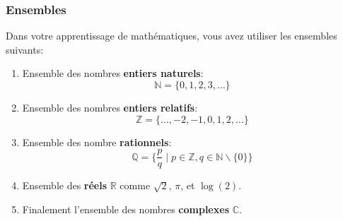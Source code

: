 \documentclass{beamer}
\begin{document}
\begin{frame}[t]
  \frametitle{Ensembles}
  {\small
     Dans votre apprentissage de mathématiques, vous avez utiliser les
      ensembles suivants:
    }

  \begin{enumerate}
    \item Ensemble des nombres \alert{\textbf{entiers naturels}}: $$\mathbb{N} =
      \{0,1,2,3,\ldots\}$$
    \item Ensemble des nombres \alert{\textbf{entiers relatifs}}: $$\mathbb{Z} =
      \{\ldots, -2, -1, 0, 1, 2, \ldots\}$$
    \item Ensemble des nombre \alert{\textbf{rationnels}}:
      $$
      \mathbb{Q} = \{\frac{p}{q}\;|\; p\in\mathbb{Z}, q\in
      \mathbb{N}\backslash\{0\}\}
      $$
    \item Ensemble des \alert{\textbf{réels}} $\mathbb{R}$ comme $\sqrt{2}$, $\pi$, et
      $\log(2)$.
    \item Finalement l'ensemble des nombres \alert{\textbf{complexes}}
      $\mathbb{C}$.
  \end{enumerate}
\end{frame}
\end{document}
